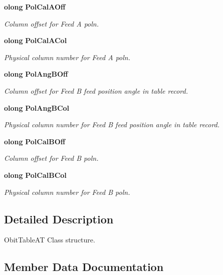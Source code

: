 \begin{CompactItemize}
{\bf olong} {\bf Pol\-Cal\-AOff}
\begin{CompactList}\small\item\em Column offset for Feed A poln. \item\end{CompactList}\item 
{\bf olong} {\bf Pol\-Cal\-ACol}
\begin{CompactList}\small\item\em Physical column number for Feed A poln. \item\end{CompactList}\item 
{\bf olong} {\bf Pol\-Ang\-BOff}
\begin{CompactList}\small\item\em Column offset for Feed B feed position angle in table record. \item\end{CompactList}\item 
{\bf olong} {\bf Pol\-Ang\-BCol}
\begin{CompactList}\small\item\em Physical column number for Feed B feed position angle in table record. \item\end{CompactList}\item 
{\bf olong} {\bf Pol\-Cal\-BOff}
\begin{CompactList}\small\item\em Column offset for Feed B poln. \item\end{CompactList}\item 
{\bf olong} {\bf Pol\-Cal\-BCol}
\begin{CompactList}\small\item\em Physical column number for Feed B poln. \item\end{CompactList}\end{CompactItemize}


\subsection{Detailed Description}
Obit\-Table\-AT Class structure. 



\subsection{Member Data Documentation}

